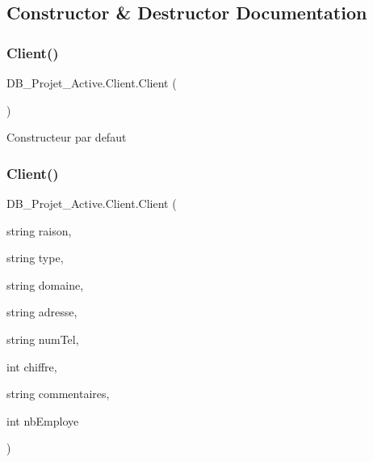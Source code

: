 \subsection{Constructor \& Destructor Documentation}
\mbox{\label{class_d_b___projet___active_1_1_client_ac2417af48ade43fe2d15374575410aee}} 
\subsubsection{\texorpdfstring{Client()}{Client()}\hspace{0.1cm}{\footnotesize\ttfamily [1/2]}}
{\footnotesize\ttfamily D\+B\+\_\+\+Projet\+\_\+\+Active.\+Client.\+Client (\begin{DoxyParamCaption}{ }\end{DoxyParamCaption})}



Constructeur par defaut 

\mbox{\label{class_d_b___projet___active_1_1_client_a48462a75f0a3ab7c52f503d0bfd23bb2}} 
\subsubsection{\texorpdfstring{Client()}{Client()}\hspace{0.1cm}{\footnotesize\ttfamily [2/2]}}
{\footnotesize\ttfamily D\+B\+\_\+\+Projet\+\_\+\+Active.\+Client.\+Client (\begin{DoxyParamCaption}\item[{string}]{raison,  }\item[{string}]{type,  }\item[{string}]{domaine,  }\item[{string}]{adresse,  }\item[{string}]{num\+Tel,  }\item[{int}]{chiffre,  }\item[{string}]{commentaires,  }\item[{int}]{nb\+Employe }\end{DoxyParamCaption})}



